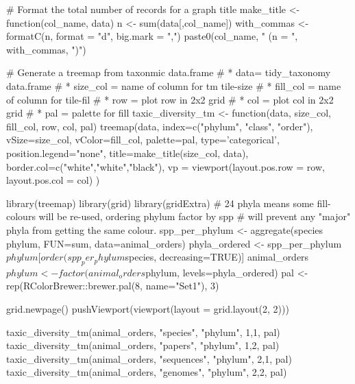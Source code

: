 \begin{example}
    
# Format the total number of records for a graph title
make_title <- function(col_name, data){
    n <- sum(data[,col_name])
    with_commas <- formatC(n, format = "d", big.mark = ",")
    paste0(col_name, " (n = ", with_commas, ")")
}

# Generate a treemap from taxonmic data.frame
# * data= tidy_taxonomy data.frame
# * size_col = name of column for tm tile-size
# * fill_col = name of column for tile-fil
# * row = plot row in 2x2 grid
# * col = plot col in 2x2 grid
# * pal = palette for fill
taxic_diversity_tm <- function(data, size_col, fill_col, row, col, pal){    
    treemap(data, 
        index=c("phylum", "class", "order"), vSize=size_col, vColor=fill_col, 
        palette=pal, type='categorical', position.legend="none", 
        title=make_title(size_col, data), border.col=c("white","white","black"),
        vp = viewport(layout.pos.row = row, layout.pos.col = col)
    )
}

library(treemap)
library(grid)
library(gridExtra)
# 24 phyla means some fill-colours will be re-used, ordering phylum factor by spp
# will prevent any "major" phyla from getting the same colour.
spp_per_phylum <- aggregate(species ~ phylum, FUN=sum, data=animal_orders)
phyla_ordered <- spp_per_phylum$phylum[ order(spp_per_phylum$species, decreasing=TRUE)]
animal_orders$phylum<- factor(animal_orders$phylum, levels=phyla_ordered)
pal <-  rep(RColorBrewer::brewer.pal(8, name="Set1"), 3)

grid.newpage()
pushViewport(viewport(layout = grid.layout(2, 2)))

taxic_diversity_tm(animal_orders, "species",   "phylum", 1,1, pal)
taxic_diversity_tm(animal_orders, "papers",    "phylum", 1,2, pal)
taxic_diversity_tm(animal_orders, "sequences", "phylum", 2,1, pal)
taxic_diversity_tm(animal_orders, "genomes",   "phylum", 2,2, pal)

\end{example}
